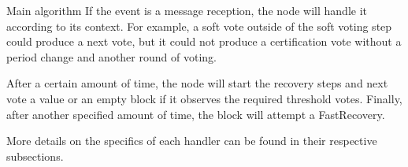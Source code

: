 \documentclass[10pt,a4paper]{article}
\begin{document}
\begin{section}{Main algorithm}
If the event is a message reception, the node will handle it according to its context. 
For example, a soft vote outside of the soft voting step could produce a next vote, 
but it could not produce a certification vote without a period change and another round of voting.

After a certain amount of time, the node will start the recovery steps and next vote a value or an empty block 
if it observes the required threshold votes. Finally, after another specified amount of time, the block will 
attempt a FastRecovery.

More details on the specifics of each handler can be found in their respective subsections.











\end{section}
\end{document}

